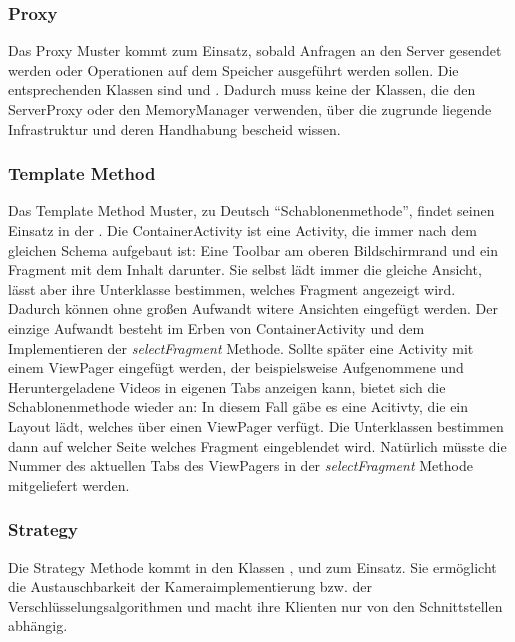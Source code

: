 \subsubsection{Proxy}
Das Proxy Muster kommt zum Einsatz, sobald Anfragen an den Server gesendet werden oder Operationen auf dem Speicher ausgeführt werden sollen. Die entsprechenden Klassen sind  und . Dadurch muss keine der Klassen, die den ServerProxy oder den MemoryManager verwenden, über die zugrunde liegende Infrastruktur und deren Handhabung bescheid wissen.

\subsubsection{Template Method}
Das Template Method Muster, zu Deutsch ``Schablonenmethode'', findet seinen Einsatz in der . Die ContainerActivity ist eine Activity, die immer nach dem gleichen Schema aufgebaut ist: Eine Toolbar am oberen Bildschirmrand und ein Fragment mit dem Inhalt darunter. Sie selbst lädt immer die gleiche Ansicht, lässt aber ihre Unterklasse bestimmen, welches Fragment angezeigt wird. Dadurch können ohne großen Aufwandt witere Ansichten eingefügt werden. Der einzige Aufwandt besteht im Erben von ContainerActivity und dem Implementieren der \textit{selectFragment} Methode.\newline
Sollte später eine Activity mit einem ViewPager eingefügt werden, der beispielsweise Aufgenommene und Heruntergeladene Videos in eigenen Tabs anzeigen kann, bietet sich die Schablonenmethode wieder an: In diesem Fall gäbe es eine Acitivty, die ein Layout lädt, welches über einen ViewPager verfügt. Die Unterklassen bestimmen dann auf welcher Seite welches Fragment eingeblendet wird. Natürlich müsste die Nummer des aktuellen Tabs des ViewPagers in der \textit{selectFragment} Methode mitgeliefert werden.

\subsubsection{Strategy}
Die Strategy Methode kommt in den Klassen ,  und   zum Einsatz. Sie ermöglicht die Austauschbarkeit der Kameraimplementierung bzw. der Verschlüsselungsalgorithmen und macht ihre Klienten nur von den Schnittstellen abhängig.
